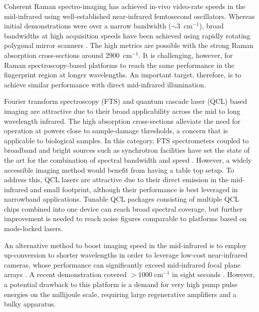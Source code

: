 \documentclass[aip,reprint]{revtex4-1}
\begin{document}
Coherent Raman spectro-imaging has achieved in-vivo video-rate speeds in the mid-infrared \cite{evansChemicalImagingTissue2005, saarVideoRateMolecularImaging2010} using well-established near-infrared femtosecond oscillators. Whereas initial demonstrations were over a narrow bandwidth (\mbox{$\sim$3 $\mathrm{cm^{-1}}$}), broad bandwidths at high acquisition speeds have been achieved using rapidly rotating polygonal mirror scanners \cite{tamamitsuUltrafastBroadbandFouriertransform2017, linMicrosecondFingerprintStimulated2021}. The high metrics are possible with the strong Raman absorption cross-sections around \mbox{2900 $\mathrm{cm^{-1}}$}. It is challenging, however, for Raman spectroscopy-based platforms to reach the same performance in the fingerprint region at longer wavelengths. An important target, therefore, is to achieve similar performance with direct mid-infrared illumination.

Fourier transform spectroscopy (FTS) and quantum cascade laser (QCL) based imaging are attractive due to their broad applicability across the mid to long wavelength infrared. The high absorption cross-sections alleviate the need for operation at powers close to sample-damage thresholds, a concern that is applicable to biological samples. In this category, FTS spectrometers coupled to broadband and bright sources such as synchrotron facilities have set the state of the art for the combination of spectral bandwidth and speed \cite{nasseHighresolutionFouriertransformInfrared2011}. However, a widely accessible imaging method would benefit from having a table top setup. To address this, QCL lasers are attractive due to their direct emission in the mid-infrared and small footprint, although their performance is best leveraged in narrowband applications. Tunable QCL packages consisting of multiple QCL chips combined into one device \cite{yehFastInfraredChemical2015,goyalActiveHyperspectralImaging2014,zimmerleiterQCLbasedMidinfraredHyperspectral2021} can reach broad spectral coverage, but further improvement is needed to reach noise figures comparable to platforms based on mode-locked lasers.



An alternative method to boost imaging speed in the mid-infrared is to employ up-conversion to shorter wavelengths in order to leverage low-cost near-infrared cameras, whose performance can significantly exceed mid-infrared focal plane arrays \cite{junaidVideorateMidinfraredHyperspectral2019,knezInfraredChemicalImaging2020,potmaRapidChemicallySelective2021}. A recent demonstration covered \mbox{$>$$1000 \; \mathrm{cm^{-1}}$} in eight seconds \cite{zhaoHighspeedScanlessEntire2023}. However, a potential drawback to this platform is a demand for very high pump pulse energies on the millijoule scale, requiring large regenerative amplifiers and a bulky apparatus.
\end{document}
